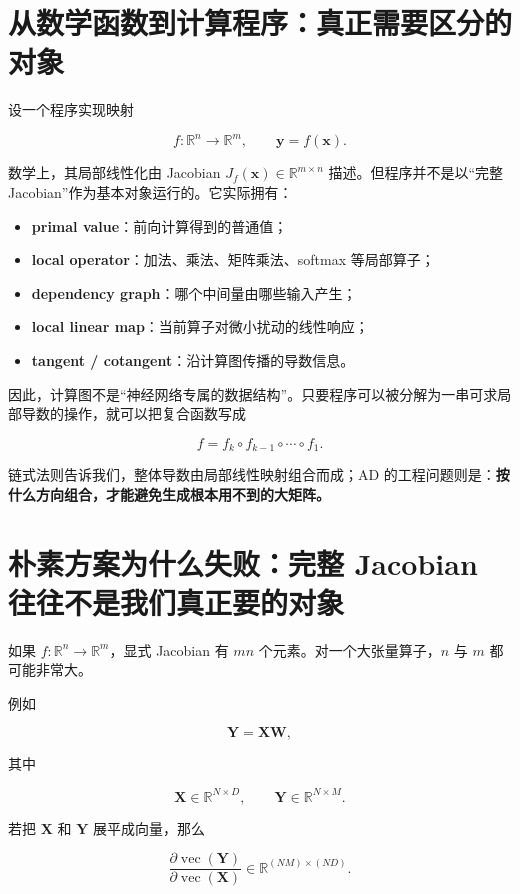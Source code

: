 \documentclass[profile=standard,twoside=false]{ipara-handbook}
\begin{document}
\section{从数学函数到计算程序：真正需要区分的对象}

设一个程序实现映射

$$
f:\mathbb{R}^{n}\to\mathbb{R}^{m},\qquad \boldsymbol{y}=f(\boldsymbol{x}).
$$

数学上，其局部线性化由 Jacobian $J_f(\boldsymbol{x})\in\mathbb{R}^{m\times n}$ 描述。但程序并不是以“完整 Jacobian”作为基本对象运行的。它实际拥有：

\begin{itemize}
  \item \textbf{primal value}：前向计算得到的普通值；
  \item \textbf{local operator}：加法、乘法、矩阵乘法、softmax 等局部算子；
  \item \textbf{dependency graph}：哪个中间量由哪些输入产生；
  \item \textbf{local linear map}：当前算子对微小扰动的线性响应；
  \item \textbf{tangent / cotangent}：沿计算图传播的导数信息。
\end{itemize}

因此，计算图不是“神经网络专属的数据结构”。只要程序可以被分解为一串可求局部导数的操作，就可以把复合函数写成

$$
f=f_k\circ f_{k-1}\circ\cdots\circ f_1.
$$

链式法则告诉我们，整体导数由局部线性映射组合而成；AD 的工程问题则是：\textbf{按什么方向组合，才能避免生成根本用不到的大矩阵。}

\section{朴素方案为什么失败：完整 Jacobian 往往不是我们真正要的对象}

如果 $f:\mathbb{R}^{n}\to\mathbb{R}^{m}$，显式 Jacobian 有 $mn$ 个元素。对一个大张量算子，$n$ 与 $m$ 都可能非常大。

例如

$$
\boldsymbol{Y}=\boldsymbol{X}\boldsymbol{W},
$$

其中

$$
\boldsymbol{X}\in\mathbb{R}^{N\times D},\qquad
\boldsymbol{Y}\in\mathbb{R}^{N\times M}.
$$

若把 $\boldsymbol{X}$ 和 $\boldsymbol{Y}$ 展平成向量，那么

$$
\frac{\partial\operatorname{vec}(\boldsymbol{Y})}
     {\partial\operatorname{vec}(\boldsymbol{X})}
\in
\mathbb{R}^{(NM)\times(ND)}.
$$
\end{document}
